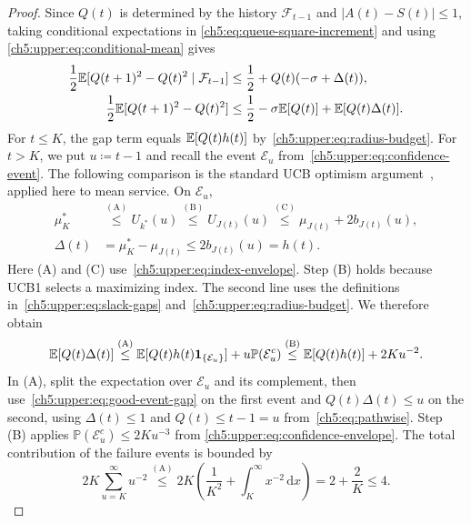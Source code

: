 \begin{proof}
Since $Q(t)$ is determined by the history $\mathcal F_{t-1}$ and $|A(t)-S(t)|\le1$,
taking conditional expectations in \eqref{ch5:eq:queue-square-increment}
and using \eqref{ch5:upper:eq:conditional-mean} gives
\begin{align}
 \frac12\mathbb{E}[Q(t+1)^2-Q(t)^2\mid\mathcal F_{t-1}]
 &\le\frac12+Q(t)(-\sigma+\Delta(t)),\notag\\
 \frac12\mathbb{E}[Q(t+1)^2-Q(t)^2]
 &\le\frac12-\sigma\mathbb{E}[Q(t)]+\mathbb{E}[Q(t)\Delta(t)].
 \label{ch5:upper:eq:drift}
\end{align}
For $t\le K$, the gap term equals $\mathbb{E}[Q(t)h(t)]$
by~\eqref{ch5:upper:eq:radius-budget}. For $t>K$, we
put $u\coloneqq t-1$ and recall the event
$\mathcal E_u$ from~\eqref{ch5:upper:eq:confidence-event}.
The following comparison is the standard UCB optimism
argument~\cite[Section~7.1]{lattimore2020bandit}, applied here to mean service.
On $\mathcal E_u$,
\begin{equation}
\begin{aligned}
 \mu_K^*
 &\overset{\mathrm{(A)}}{\le}U_{k^*}(u)
 \overset{\mathrm{(B)}}{\le}U_{J(t)}(u)
 \overset{\mathrm{(C)}}{\le}\mu_{J(t)}+2b_{J(t)}(u),\\
 \Delta(t)
 &=\mu_K^*-\mu_{J(t)}\le2b_{J(t)}(u)=h(t).
\end{aligned}
 \label{ch5:upper:eq:good-event-gap}
\end{equation}
Here (A) and (C) use~\eqref{ch5:upper:eq:index-envelope}.
Step (B) holds because UCB1 selects a maximizing index.
The second line uses the definitions
in~\eqref{ch5:upper:eq:slack-gaps}
and~\eqref{ch5:upper:eq:radius-budget}.
We therefore obtain
\begin{equation}
\mathbb{E}[Q(t)\Delta(t)]
\overset{\mathrm{(A)}}{\le}\mathbb{E}[Q(t)h(t)\mathbf{1}_{\{\mathcal E_u\}}]
  +u\mathbb P(\mathcal E_u^c)
\overset{\mathrm{(B)}}{\le}\mathbb{E}[Q(t)h(t)]+2Ku^{-2}.
\label{ch5:upper:eq:weighted-gap-bound}
\end{equation}
In (A), split the expectation over $\mathcal E_u$ and its complement,
then use~\eqref{ch5:upper:eq:good-event-gap} on the first event and
$Q(t)\Delta(t)\le u$ on the second, using $\Delta(t)\le1$ and
$Q(t)\le t-1=u$ from~\eqref{ch5:eq:pathwise}. Step (B) applies
$\mathbb P(\mathcal E_u^c)\le2Ku^{-3}$ from
\eqref{ch5:upper:eq:confidence-envelope}.
The total contribution of the failure events is bounded by
\begin{equation}
 2K\sum_{u=K}^{\infty}u^{-2}
 \overset{\mathrm{(A)}}{\le}2K\left(\frac1{K^2}+\int_K^{\infty}x^{-2}\,\mathrm dx\right)
 =2+\frac2K\le4.

\end{equation}
\end{proof}

